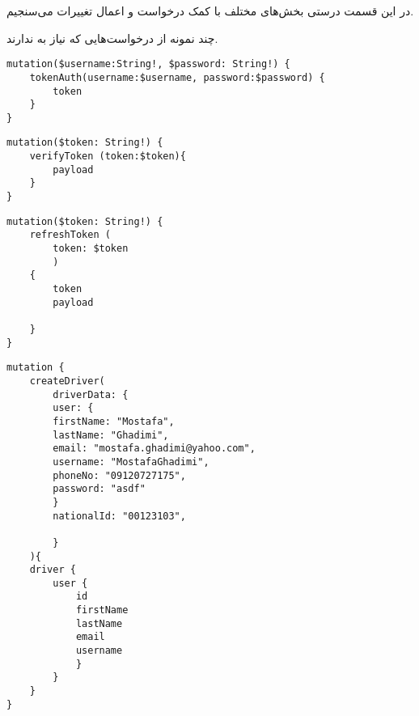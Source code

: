 
در این قسمت درستی بخش‌های مختلف  با کمک درخواست‌  و اعمال تغییرات  می‌سنجیم. 

	 چند نمونه از درخواست‌هایی که نیاز به  ندارند.
	
		 

	
	
	\begin{latin}
		\begin{verbatim}
mutation($username:String!, $password: String!) {
	tokenAuth(username:$username, password:$password) {
		token
	}
}
		\end{verbatim}
	\end{latin}

	 



	\begin{latin}	
		\begin{verbatim}
mutation($token: String!) {
	verifyToken (token:$token){
		payload 
	}	
}
		\end{verbatim}
	\end{latin}
	
	 
	
	
	
	\begin{latin}
		\begin{verbatim}
mutation($token: String!) {
	refreshToken (
		token: $token
		)
	{
		token
		payload
		
	}
}
		\end{verbatim}
	\end{latin}

	 
	\begin{latin}
		\begin{verbatim}
mutation {
	createDriver(
		driverData: {
		user: {
		firstName: "Mostafa",
		lastName: "Ghadimi",
		email: "mostafa.ghadimi@yahoo.com",
		username: "MostafaGhadimi",
		phoneNo: "09120727175",
		password: "asdf"
		}
		nationalId: "00123103",
	
		}
	){
	driver {
		user {
			id
			firstName
			lastName
			email
			username
			}
		}
	}
}
		\end{verbatim}
	\end{latin}
	
